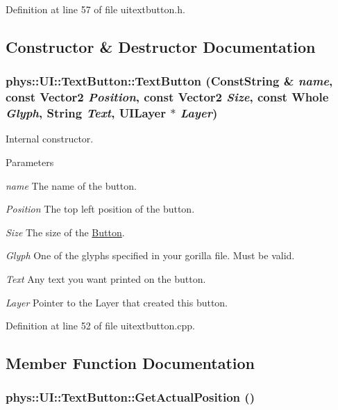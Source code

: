 Definition at line 57 of file uitextbutton.h.



\subsection{Constructor \& Destructor Documentation}
\hypertarget{classphys_1_1UI_1_1TextButton_a319fd053824be479335d15df5f21131f}{
\subsubsection[{TextButton}]{\setlength{\rightskip}{0pt plus 5cm}phys::UI::TextButton::TextButton ({\bf ConstString} \& {\em name}, \/  const {\bf Vector2} {\em Position}, \/  const {\bf Vector2} {\em Size}, \/  const {\bf Whole} {\em Glyph}, \/  {\bf String} {\em Text}, \/  {\bf UILayer} $\ast$ {\em Layer})}}
\label{df/d03/classphys_1_1UI_1_1TextButton_a319fd053824be479335d15df5f21131f}


Internal constructor. 


\begin{DoxyParams}{Parameters}
\item[{\em name}]The name of the button. \item[{\em Position}]The top left position of the button. \item[{\em Size}]The size of the \hyperlink{classphys_1_1UI_1_1Button}{Button}. \item[{\em Glyph}]One of the glyphs specified in your gorilla file. Must be valid. \item[{\em Text}]Any text you want printed on the button. \item[{\em Layer}]Pointer to the Layer that created this button. \end{DoxyParams}


Definition at line 52 of file uitextbutton.cpp.



\subsection{Member Function Documentation}
\hypertarget{classphys_1_1UI_1_1TextButton_ab406bec58bf6244c3e867fefd19d4d7f}{
\subsubsection[{GetActualPosition}]{ phys::UI::TextButton::GetActualPosition ()}}
\label{df/d03/classphys_1_1UI_1_1TextButton_ab406bec58bf6244c3e867fefd19d4d7f}


